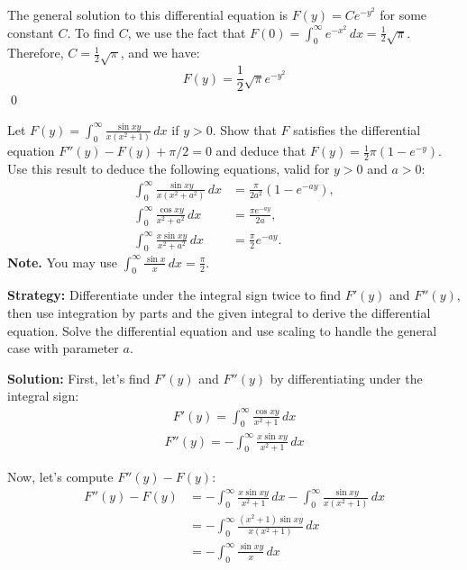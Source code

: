 The general solution to this differential equation is $F(y) = C e^{-y^2}$ for some constant $C$. To find $C$, we use the fact that $F(0) = \int_{0}^{\infty} e^{-x^2} \, dx = \frac{1}{2} \sqrt{\pi}$. Therefore, $C = \frac{1}{2} \sqrt{\pi}$, and we have:
\[F(y) = \frac{1}{2} \sqrt{\pi} e^{-y^2}\]\qed


\begin{problembox}
\begin{problemstatement}
Let $F(y) = \int_{0}^{\infty} \frac{\sin xy}{x(x^2 + 1)} \, dx$ if $y > 0$. Show that $F$ satisfies the differential equation $F''(y) - F(y) + \pi / 2 = 0$ and deduce that $F(y) = \frac{1}{2} \pi (1 - e^{-y})$. Use this result to deduce the following equations, valid for $y > 0$ and $a > 0$:
\begin{align*}
\int_{0}^{\infty} \frac{\sin xy}{x(x^2 + a^2)} \, dx &= \frac{\pi}{2a^2} (1 - e^{-ay}), \\
\int_{0}^{\infty} \frac{\cos xy}{x^2 + a^2} \, dx &= \frac{\pi e^{-ay}}{2a}, \\
\int_{0}^{\infty} \frac{x \sin xy}{x^2 + a^2} \, dx &= \frac{\pi}{2} e^{-ay}.
\end{align*}
\textbf{Note.} You may use $\int_{0}^{\infty} \frac{\sin x}{x} \, dx = \frac{\pi}{2}.$
\end{problemstatement}
\end{problembox}

\noindent\textbf{Strategy:} Differentiate under the integral sign twice to find $F'(y)$ and $F''(y)$, then use integration by parts and the given integral to derive the differential equation. Solve the differential equation and use scaling to handle the general case with parameter $a$.

\bigskip\noindent\textbf{Solution:}
First, let's find $F'(y)$ and $F''(y)$ by differentiating under the integral sign:
\begin{align*}
F'(y) = \int_{0}^{\infty} \frac{\cos xy}{x^2 + 1} \, dx
\end{align*}
\begin{align*}
F''(y) = -\int_{0}^{\infty} \frac{x \sin xy}{x^2 + 1} \, dx
\end{align*}

Now, let's compute $F''(y) - F(y)$:
\begin{align*}
F''(y) - F(y) &= -\int_{0}^{\infty} \frac{x \sin xy}{x^2 + 1} \, dx - \int_{0}^{\infty} \frac{\sin xy}{x(x^2 + 1)} \, dx \\
&= -\int_{0}^{\infty} \frac{(x^2 + 1) \sin xy}{x(x^2 + 1)} \, dx \\
&= -\int_{0}^{\infty} \frac{\sin xy}{x} \, dx
\end{align*}

